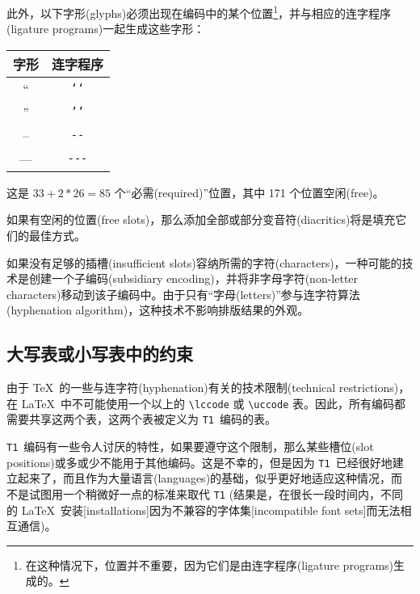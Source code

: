 \documentclass{ltxguide}[1994/11/20]
\providecommand{\Enc}[1]{\texttt{#1}}
\begin{document}
此外，以下字形(glyphs)必须出现在编码中的某个位置\footnote{在这种情况下，位置并不重要，因为它们是由连字程序(ligature programs)生成的。}，并与相应的连字程序(ligature programs)一起生成这些字形：
\begin{center}
\begin{tabular}[t]{cc}
字形   & 连字程序 \\ \hline
 ``     & \texttt{`\/`} \\
 ''     & \texttt{'\/'} \\
 --     & \texttt{-\/-} \\
 ---    & \texttt{-\/-\/-} \\
\end{tabular}
\end{center}

这是 $33 + 2 * 26 = 85$ 个“必需(required)”位置，其中 171 个位置空闲(free)。

如果有空闲的位置(free slots)，那么添加全部或部分变音符(diacritics)将是填充它们的最佳方式。

如果没有足够的插槽(insufficient slots)容纳所需的字符(characters)，一种可能的技术是创建一个子编码(subsidiary encoding)，并将非字母字符(non-letter characters)移动到该子编码中。由于只有“字母(letters)”参与连字符算法(hyphenation algorithm)，这种技术不影响排版结果的外观。

\subsection{大写表或小写表中的约束}

由于 \TeX{}\ 的一些与连字符(hyphenation)有关的技术限制(technical restrictions)，在 \LaTeX{}\ 中不可能使用一个以上的 \verb=\lccode= 或 \verb=\uccode= 表。因此，所有编码都需要共享这两个表，这两个表被定义为 \Enc{T1}\ 编码的表。

\Enc{T1}\ 编码有一些令人讨厌的特性，如果要遵守这个限制，那么某些槽位(slot positions)或多或少不能用于其他编码。这是不幸的，但是因为 \Enc{T1}\ 已经很好地建立起来了，而且作为大量语言(languages)的基础，似乎更好地适应这种情况，而不是试图用一个稍微好一点的标准来取代 \Enc{T1} (结果是，在很长一段时间内，不同的 \LaTeX{}\ 安装[installations]因为不兼容的字体集[incompatible font sets]而无法相互通信)。
\end{document}

